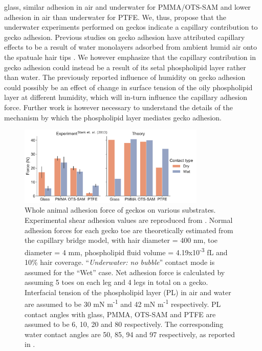 \documentclass[vruler,JEB]{COB}%
\begin{document}
glass, similar adhesion in air and underwater for PMMA/OTS-SAM and
lower adhesion in air than underwater for PTFE. We, thus, propose
that the underwater experiments performed on geckos \citep{RN199,RN15}
indicate a capillary contribution to gecko adhesion. Previous studies on gecko adhesion have attributed capillary effects to be a result of water monolayers adsorbed from ambient humid air onto the spatuale hair tips \citep{RN197, RN203, RN218}.
We however emphasize that the capillary contribution in gecko adhesion could instead be a result of its setal phospholipid layer rather than water.
The previously reported influence of humidity on gecko adhesion \citep{RN197} could possibly be an effect of change in surface tension of the oily phospholipid layer at different humidity, which will in-turn influence the capillary adhesion force. Further work is however necessary to understand the details of the mechanism by which the phospholipid layer mediates gecko adhesion.

\begin{figure}
\centering
\includegraphics[width=3.5in]{Figure-9-Gecko_comparison}\caption{\label{fig:Comparison-with-model}Whole animal adhesion force of geckos
on various substrates. Experimental shear adhesion values are reproduced
from \citet{RN15}. Normal adhesion forces for each gecko
toe are theoretically estimated from the capillary bridge model, with
hair diameter = 400 nm, toe diameter = 4 mm, phospholipid fluid volume
= 4.19x10\protect\textsuperscript{-3} fL and 10\% hair coverage.
\textquotedblleft\emph{Underwater: no bubble}\textquotedblright{}
contact mode is assumed for the \textquotedblleft Wet\textquotedblright{}
case. Net adhesion force is calculated by assuming 5 toes on each
leg and 4 legs in total on a gecko. Interfacial tension of the phospholipid
layer (PL) in air and water are assumed to be 30 mN m\protect\textsuperscript{-1} and 42 mN m\protect\textsuperscript{-1}
respectively. PL contact angles with glass, PMMA, OTS-SAM and PTFE
are assumed to be 6\textdegree , 10\textdegree , 20\textdegree{} and
80\textdegree{} respectively. The corresponding water contact angles
are 50\textdegree , 85\textdegree , 94\textdegree{} and 97\textdegree{}
respectively, as reported in \citet{RN15}.}
\end{figure}
\end{document}
